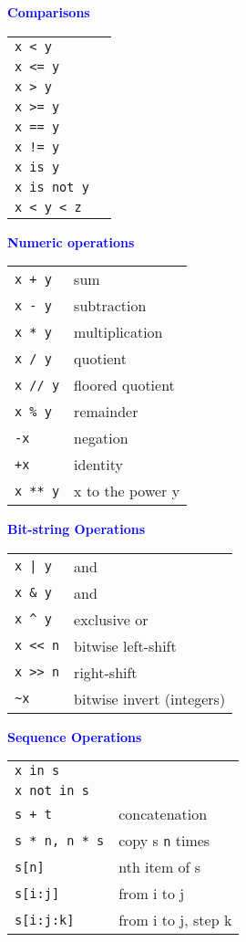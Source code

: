 \documentclass{article}
\newcommand{\header}[1]{
  {\large \textcolor{blue}{\textbf{#1}}}
  \vspace*{.5em}
}
\begin{document}
\begin{multicols}{4}
\header{Comparisons}

\begin{tabular}{ll}
\texttt{x < y}  & \\ 
\texttt{x <= y} & \\ 
\texttt{x > y}  & \\ 
\texttt{x >= y} & \\ 
\texttt{x == y} & \\ 
\texttt{x != y} & \\ 
\texttt{x is y} & \\ 
\texttt{x is not y} & \\ 
\texttt{x < y < z}  & \\ 
\end{tabular}

\header{Numeric operations}

\begin{tabular}{ll}
\texttt{x + y}   & sum \\
\texttt{x - y}   & subtraction \\
\texttt{x * y}   & multiplication \\
\texttt{x / y}   & quotient \\
\texttt{x // y}  & floored quotient \\
\texttt{x \% y}  & remainder \\
\texttt{-x}      & negation \\
\texttt{+x}      & identity \\
\texttt{x ** y}  & x to the power y \\
\end{tabular}

\header{Bit-string Operations}

\begin{tabular}{ll}
\texttt{x | y}   & and \\
\texttt{x \& y}  & and \\
\verb!x ^ y! & exclusive or \\
\verb!x << n! & bitwise left-shift \\
\verb!x >> n! & right-shift \\
\verb+~x+ & bitwise invert (integers)  \\ 
\end{tabular}

\header{Sequence Operations}

\begin{tabular}{ll}
\texttt{x in s} & \\
\texttt{x not in s} & \\
\texttt{s + t} & concatenation \\
\texttt{s * n, n * s} & copy s \texttt{n} times \\
\texttt{s[n]} & nth item of s \\
\texttt{s[i:j]} & from i to j \\
\texttt{s[i:j:k]} & from i to j, step k \\
\end{tabular}


\end{multicols}
\end{document}
